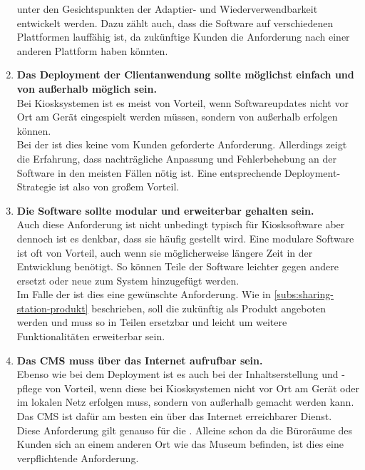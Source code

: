 \begin{enumerate}[label=\textbf{NFA\arabic*}]
  unter den Gesichtspunkten der Adaptier- und Wiederverwendbarkeit entwickelt werden. Dazu zählt auch, dass die Software
  auf verschiedenen Plattformen lauffähig ist, da zukünftige Kunden die Anforderung nach einer anderen Plattform
  haben könnten. 
  \item\label{nfa7} \textbf{Das Deployment der Clientanwendung sollte möglichst einfach und von außerhalb möglich sein.}\\
  Bei Kiosksystemen ist es meist von Vorteil, wenn Softwareupdates nicht vor Ort am Gerät eingespielt werden 
  müssen, sondern von außerhalb erfolgen können.\\
  Bei der \shst{} ist dies keine vom Kunden geforderte Anforderung. Allerdings zeigt die Erfahrung, dass nachträgliche
  Anpassung und Fehlerbehebung an der Software in den meisten Fällen nötig ist. Eine entsprechende Deployment-Strategie
  ist also von großem Vorteil.
  \item\label{nfa8} \textbf{Die Software sollte modular und erweiterbar gehalten sein.}\\
  Auch diese Anforderung ist nicht unbedingt typisch für Kiosksoftware aber dennoch ist es denkbar,
  dass sie häufig gestellt wird. 
  Eine modulare Software ist oft von Vorteil, auch wenn sie möglicherweise längere Zeit in der Entwicklung
  benötigt. So können Teile der Software leichter gegen andere ersetzt oder neue zum System hinzugefügt 
  werden.\\
  Im Falle der \shst{} ist dies eine gewünschte Anforderung. Wie in \autoref{subs:sharing-station-produkt} beschrieben,
  soll die \shst{} zukünftig als Produkt angeboten werden und muss so in Teilen ersetzbar
  und leicht um weitere Funktionalitäten erweiterbar sein. 
  \item\label{nfa9} \textbf{Das CMS muss über das Internet aufrufbar sein.}\\
  Ebenso wie bei dem Deployment ist es auch bei der Inhaltserstellung und -pflege von Vorteil, wenn diese bei 
  Kiosksystemen nicht vor Ort am Gerät oder im lokalen Netz erfolgen muss, sondern von außerhalb gemacht 
  werden kann. Das CMS ist dafür am besten ein über das Internet erreichbarer Dienst.\\
  Diese Anforderung gilt genauso für die \shst{}. Alleine schon da die Büroräume des Kunden sich an einem 
  anderen Ort wie das Museum befinden, ist dies eine verpflichtende Anforderung.
\end{enumerate}
